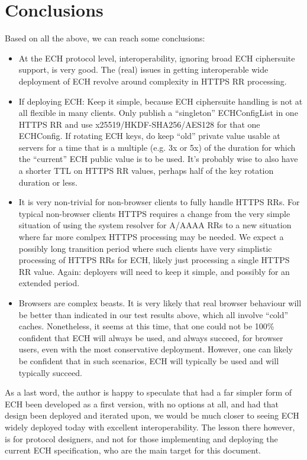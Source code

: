 \section{Conclusions}

Based on all the above, we can reach some conclusions:

\begin{itemize}

    \item
        At the ECH protocol level, interoperability, ignoring broad ECH
        ciphersuite support, is very good. The (real) issues in getting
        interoperable wide deployment of ECH revolve around complexity in HTTPS
        RR processing.

    \item
        If deploying ECH: Keep it simple, because ECH ciphersuite handling is
        not at all flexible in many clients. Only publish a ``singleton''
        ECHConfigList in one HTTPS RR and use x25519/HKDF-SHA256/AES128 for
        that one ECHConfig. If rotating ECH keys, do keep ``old'' private
        value usable at servers for a time that is a multiple (e.g. 3x or
        5x) of the duration for which the ``current'' ECH public value is
        to be used. It's probably wise to also have a shorter TTL on 
        HTTPS RR values, perhaps half of the key rotation duration or less.

    \item
        It is very non-trivial for non-browser clients to fully handle HTTPS
        RRs.  For typical non-browser clients HTTPS requires a change from the
        very simple situation of using the system resolver for A/AAAA RRs to a
        new situation where far more comlpex HTTPS processing may be needed. We
        expect a possibly long transition period where such clients have very
        simplistic processing of HTTPS RRs for ECH, likely just processing a
        single HTTPS RR value. Again: deployers will need to keep it simple,
        and possibly for an extended period.

    \item
        Browsers are complex beasts. It is very likely that real browser
        behaviour will be better than indicated in our test results above,
        which all involve ``cold'' caches. Nonetheless, it seems at this time,
        that one could not be 100\% confident that ECH will always be used, and
        always succeed, for browser users, even with the most conservative
        deployment. However, one can likely be confident that in such
        scenarios, ECH will typically be used and will typically succeed.

\end{itemize}

As a last word, the author is happy to speculate that had a far simpler
form of ECH been developed as a first version, with no options at all,
and had that design been deployed and iterated upon, we would be much
closer to seeing ECH widely deployed today with excellent interoperability.
The lesson there however, is for protocol designers, and not for those
implementing and deploying the current ECH specification, who are the
main target for this document.
